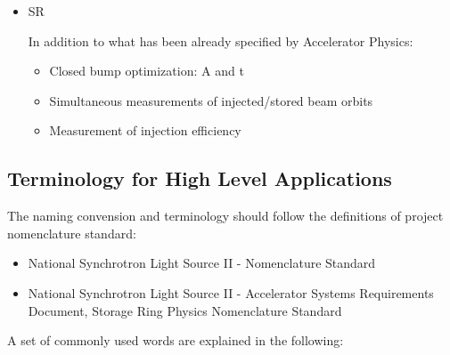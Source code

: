 \documentclass[letterpaper,showtrims]{memoir}
\begin{document}
\begin{itemize}
\item SR

  In addition to what has been already specified by Accelerator Physics:

\begin{itemize}
\item Closed bump optimization: A and t
\item Simultaneous measurements of injected/stored beam orbits
\item Measurement of injection efficiency
\end{itemize}

\end{itemize}


\subsection{Terminology for High Level Applications}

The naming convension and terminology should follow the definitions of
project nomenclature standard:

\begin{itemize}
\item National Synchrotron Light Source II - Nomenclature Standard~\cite{lt_2009_nomenclature}
\item National Synchrotron Light Source II - Accelerator Systems
Requirements Document, Storage Ring Physics Nomenclature Standard~\cite{lt_2008_nomenclature}
\end{itemize}

A set of commonly used words are explained in the following:
\end{document}
